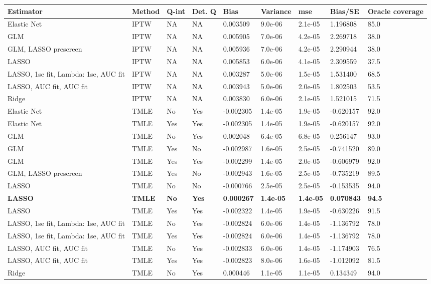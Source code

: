 
\begin{longtable}[l]{lllllllll}
\toprule
Estimator & Method & Q-int & Det. Q & Bias & Variance & mse & Bias/SE & Oracle coverage\\
\midrule
Elastic Net & IPTW & NA & NA & 0.003509 & 9.0e-06 & 2.1e-05 & 1.196808 & 85.0\\
GLM & IPTW & NA & NA & 0.005905 & 7.0e-06 & 4.2e-05 & 2.269718 & 38.0\\
GLM, LASSO prescreen & IPTW & NA & NA & 0.005936 & 7.0e-06 & 4.2e-05 & 2.290944 & 38.0\\
LASSO & IPTW & NA & NA & 0.005853 & 6.0e-06 & 4.1e-05 & 2.309559 & 37.5\\
LASSO, 1se fit, Lambda: 1se, AUC fit & IPTW & NA & NA & 0.003287 & 5.0e-06 & 1.5e-05 & 1.531400 & 68.5\\
LASSO, AUC fit, AUC fit & IPTW & NA & NA & 0.003943 & 5.0e-06 & 2.0e-05 & 1.802503 & 53.5\\
Ridge & IPTW & NA & NA & 0.003830 & 6.0e-06 & 2.1e-05 & 1.521015 & 71.5\\
Elastic Net & TMLE & No & Yes & -0.002305 & 1.4e-05 & 1.9e-05 & -0.620157 & 92.0\\
Elastic Net & TMLE & Yes & Yes & -0.002305 & 1.4e-05 & 1.9e-05 & -0.620157 & 92.0\\
GLM & TMLE & No & Yes & 0.002048 & 6.4e-05 & 6.8e-05 & 0.256147 & 93.0\\
GLM & TMLE & Yes & No & -0.002987 & 1.6e-05 & 2.5e-05 & -0.741520 & 89.0\\
GLM & TMLE & Yes & Yes & -0.002299 & 1.4e-05 & 2.0e-05 & -0.606979 & 92.0\\
GLM, LASSO prescreen & TMLE & Yes & No & -0.002943 & 1.6e-05 & 2.5e-05 & -0.735219 & 89.5\\
LASSO & TMLE & No & No & -0.000766 & 2.5e-05 & 2.5e-05 & -0.153535 & 94.0\\
\midrule
\textbf{LASSO} & \textbf{TMLE} & \textbf{No} & \textbf{Yes} & \textbf{0.000267} & \textbf{1.4e-05} & \textbf{1.4e-05} & \textbf{0.070843} & \textbf{94.5}\\
\midrule
LASSO & TMLE & Yes & Yes & -0.002322 & 1.4e-05 & 1.9e-05 & -0.630226 & 91.5\\
LASSO, 1se fit, Lambda: 1se, AUC fit & TMLE & No & Yes & -0.002824 & 6.0e-06 & 1.4e-05 & -1.136792 & 78.0\\
LASSO, 1se fit, Lambda: 1se, AUC fit & TMLE & Yes & Yes & -0.002824 & 6.0e-06 & 1.4e-05 & -1.136792 & 78.0\\
LASSO, AUC fit, AUC fit & TMLE & No & Yes & -0.002833 & 6.0e-06 & 1.4e-05 & -1.174903 & 76.5\\
LASSO, AUC fit, AUC fit & TMLE & Yes & Yes & -0.002823 & 8.0e-06 & 1.6e-05 & -1.012092 & 81.5\\
Ridge & TMLE & No & Yes & 0.000446 & 1.1e-05 & 1.1e-05 & 0.134349 & 94.0\\
\bottomrule
\end{longtable}
